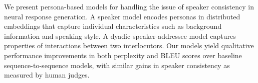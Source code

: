 We present persona-based models for handling the issue of speaker consistency in neural response generation.  A speaker model encodes  personas in  distributed embeddings that capture individual characteristics such as background information and speaking style. A dyadic speaker-addressee model captures properties of interactions between two interlocutors. Our models yield qualitative performance improvements in both perplexity and BLEU scores over baseline sequence-to-sequence models, with similar gains in speaker consistency as measured by human judges.
